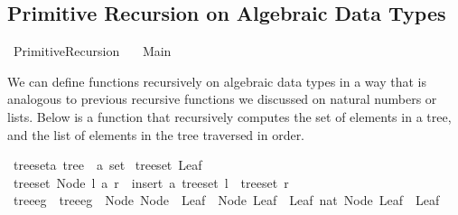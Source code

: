 %
\begin{isabellebody}%
%
%
\begin{isamarkuptext}%
\section*{Primitive Recursion on Algebraic Data Types}%
\end{isamarkuptext}\isamarkuptrue%
%
\isadelimtheory
%
\endisadelimtheory
%
\isatagtheory
{}\isamarkupfalse%
\ Primitive{\isacharunderscore}{\kern0pt}Recursion\isanewline
\ \ \ Main\isanewline
{}%
\endisatagtheory
{\isafoldtheory}%
%
\isadelimtheory
%
\endisadelimtheory
%
\begin{isamarkuptext}%
We can define functions recursively on algebraic data types in a way that is analogous to 
      previous recursive functions we discussed on natural numbers or lists. Below is a function
      that recursively computes the set of elements in a tree, and the list of elements in the
      tree traversed in order.%
\end{isamarkuptext}\isamarkuptrue%
\isanewline
{}\isamarkupfalse%
\ tree{\isacharunderscore}{\kern0pt}set{\isacharcolon}{\kern0pt}{\isacharcolon}{\kern0pt}{\isachardoublequoteopen}{\isacharprime}{\kern0pt}a\ tree\ {\isasymRightarrow}\ {\isacharprime}{\kern0pt}a\ set{\isachardoublequoteclose}\ \isanewline
{\isachardoublequoteopen}tree{\isacharunderscore}{\kern0pt}set\ Leaf\ {\isacharequal}{\kern0pt}\ {\isacharbraceleft}{\kern0pt}{\isacharbraceright}{\kern0pt}{\isachardoublequoteclose}\isanewline
{\isacharbar}{\kern0pt}\ {\isachardoublequoteopen}tree{\isacharunderscore}{\kern0pt}set\ {\isacharparenleft}{\kern0pt}Node\ l\ a\ r{\isacharparenright}{\kern0pt}\ {\isacharequal}{\kern0pt}\ insert\ a\ {\isacharparenleft}{\kern0pt}{\isacharparenleft}{\kern0pt}tree{\isacharunderscore}{\kern0pt}set\ l{\isacharparenright}{\kern0pt}\ {\isasymunion}\ {\isacharparenleft}{\kern0pt}tree{\isacharunderscore}{\kern0pt}set\ r{\isacharparenright}{\kern0pt}{\isacharparenright}{\kern0pt}{\isachardoublequoteclose}\isanewline
\isanewline
{}\isamarkupfalse%
\ tree{\isacharunderscore}{\kern0pt}eg\ \ {\isachardoublequoteopen}tree{\isacharunderscore}{\kern0pt}eg\ {\isasymequiv}\ Node\ {\isacharparenleft}{\kern0pt}Node\ \ Leaf\ {}\ {\isacharparenleft}{\kern0pt}Node\ Leaf\ {}\ Leaf{\isacharparenright}{\kern0pt}{\isacharparenright}{\kern0pt}\ {\isacharparenleft}{\kern0pt}{}{\isacharcolon}{\kern0pt}{\isacharcolon}{\kern0pt}nat{\isacharparenright}{\kern0pt}\ {\isacharparenleft}{\kern0pt}Node\ Leaf\ {}\ Leaf{\isacharparenright}{\kern0pt}{\isachardoublequoteclose}\isanewline

\end{isabellebody}
